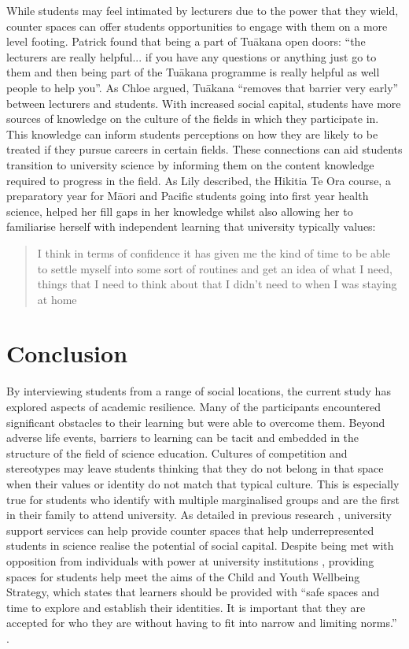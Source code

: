 While students may feel intimated by lecturers due to the power that they wield, counter spaces can offer students opportunities to engage with them on a more level footing. Patrick found that being a part of Tu\={a}kana open doors: ``the lecturers are really helpful... if you have any questions or anything just go to them and then being part of the Tu\={a}kana programme is really helpful as well people to help you''. As Chloe argued, Tu\={a}kana ``removes that barrier very early'' between lecturers and students. With increased social capital, students have more sources of knowledge on the culture of the fields in which they participate in. This knowledge can inform students perceptions on how they are likely to be treated if they pursue careers in certain fields. These connections can aid students transition to university science by informing them on the content knowledge required to progress in the field. As Lily described, the Hikitia Te Ora course, a preparatory year for M\={a}ori and Pacific students going into first year health science, helped her fill gaps in her knowledge whilst also allowing her to familiarise herself with independent learning that university typically values: \blockquote{I think in terms of confidence it has given me the kind of time to be able to settle myself into some sort of routines and get an idea of what I need, things that I need to think about that I didn't need to when I was staying at home}. 



\section{Conclusion}
By interviewing students from a range of social locations, the current study has explored aspects of academic resilience. Many of the participants encountered significant obstacles to their learning but were able to overcome them. Beyond adverse life events, barriers to learning can be tacit and embedded in the structure of the field of science education. Cultures of competition and stereotypes may leave students thinking that they do not belong in that space when their values or identity do not match that typical culture. This is especially true for students who identify with multiple marginalised groups and are the first in their family to attend university. As detailed in previous research \cite{wilson2011awhina,mayeda2014you}, university support services can help provide counter spaces that help underrepresented students in science realise the potential of social capital. Despite being met with opposition from individuals with power at university institutions \cite{nakhid2006ethics}, providing spaces for students help meet the aims of the Child and Youth Wellbeing Strategy, which states that learners should be provided with ``safe spaces and time to explore and establish their identities. It is important that they are accepted for who they are without having to fit into narrow and limiting norms.'' \citep{wellbeing2019}.



